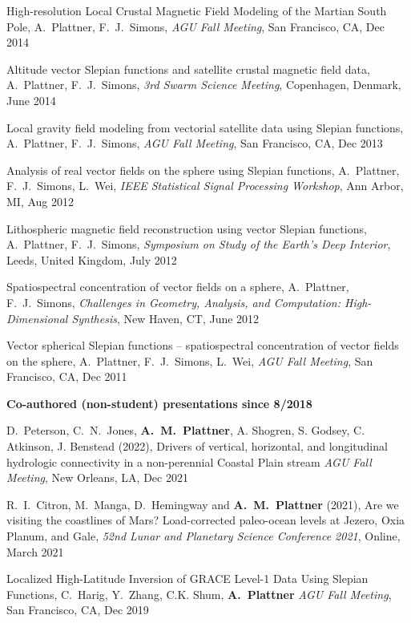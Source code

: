 \documentclass[10pt]{article}
\begin{document}
\spcp
High-resolution Local Crustal Magnetic Field Modeling of the Martian South Pole,
A.~Plattner,  F.~J.~Simons,
\emph{AGU Fall Meeting}, San Francisco, CA, Dec 2014

\spcp
Altitude vector Slepian functions and satellite crustal magnetic field data,
A.~Plattner,  F.~J.~Simons,
\emph{3rd Swarm Science Meeting}, Copenhagen, Denmark, June 2014

\spcp
Local gravity field modeling from vectorial satellite data using Slepian functions,
A.~Plattner,  F.~J.~Simons,
\emph{AGU Fall Meeting}, San Francisco, CA, Dec 2013

\spcp
Analysis of real vector fields on the sphere using Slepian functions,
A.~Plattner, F.~J.~Simons, L.~Wei,
\emph{IEEE Statistical Signal Processing Workshop}, Ann Arbor, MI, Aug 2012

\spcp
Lithospheric magnetic field reconstruction using vector Slepian functions,
A.~Plattner, F.~J.~Simons,
\emph{Symposium on Study of the Earth's Deep Interior}, Leeds, United Kingdom, July 2012

%

\spcp
Spatiospectral concentration of vector fields on a sphere,
A.~Plattner, F.~J.~Simons,
\emph{Challenges in Geometry, Analysis, and Computation: High-Dimensional Synthesis}, 
New Haven, CT, June 2012

\spcp
Vector spherical Slepian functions -- spatiospectral concentration of vector fields on the sphere,
A.~Plattner, F.~J.~Simons, L.~Wei,
\emph{AGU Fall Meeting}, San Francisco, CA, Dec 2011

\clearpage

\textbf{\tsize Co-authored (non-student) presentations since 8/2018}

\spcp
D.~Peterson, C.~N.~Jones, \textbf{A.~M.~Plattner}, A. Shogren, S. Godsey, C. Atkinson, J. Benstead (2022),
Drivers of vertical, horizontal, and longitudinal hydrologic connectivity in a non-perennial Coastal Plain stream
\emph{AGU Fall Meeting}, New Orleans, LA, Dec 2021

\spcp
R.~I.~Citron, M.~Manga, D.~Hemingway and \textbf{A.~M.~Plattner} (2021),
Are we visiting the coastlines of Mars? Load-corrected paleo-ocean levels at Jezero, Oxia Planum, and Gale,
\emph{52nd Lunar and Planetary Science Conference 2021}, Online, March 2021

\spcp
Localized High-Latitude Inversion of GRACE Level-1 Data Using Slepian Functions,
C.~Harig, Y.~Zhang, C.K. Shum, \textbf{A.~Plattner}
\emph{AGU Fall Meeting}, San Francisco, CA, Dec 2019
\end{document}

